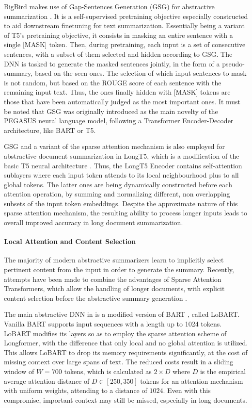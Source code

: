 \documentclass[preprint,review,10pt]{elsarticle}
\begin{document}
	BigBird makes use of Gap-Sentences Generation (GSG) for abstractive summarization \cite{pegasus}. It is a self-supervised pretraining objective especially constructed to aid downstream finetuning for text summarization. Essentially being a variant of T5's pretraining objective, it consists in masking an entire sentence with a single [MASK] token. Then, during pretraining, each input is a set of consecutive sentences, with a subset of them selected and hidden according to GSG. The DNN is tasked to generate the masked sentences jointly, in the form of a pseudo-summary, based on the seen ones. The selection of which input sentences to mask is not random, but based on the ROUGE score of each sentence with the remaining input text. Thus, the ones  finally hidden with [MASK] tokens are those that have been automatically judged as the most important ones. It must be noted that GSG was originally introduced as the main novelty of the PEGASUS neural language model, following a Transformer Encoder-Decoder architecture, like BART or T5.
	
	GSG and a variant of the sparse attention mechanism is also employed for abstractive document summarization in LongT5, which is a modification of the basic T5 neural architecture \cite{Guo22LongT5}. Thus, the LongT5 Encoder contains self-attention sublayers where each input token attends to its local neighbourhood plus to all global tokens. The latter ones are being dynamically constructed before each attention operation, by summing and normalizing different, non overlapping subsets of the input token embeddings. Despite the approximate nature of this sparse attention mechanism, the resulting ability to process longer inputs leads to overall improved accuracy in long document summarization.
	
	\paragraph{Local Attention and Content Selection} The majority of modern abstractive summarizers learn to implicitly select pertinent content from the input in order to generate the summary. Recently, attempts have been made to combine the advantages of Sparse Attention Transformers, which allow the handling of longer documents, with explicit content selection before the abstractive summary generation \cite{gales}.
	
	The main abstractive DNN in \cite{gales} is a modified version of BART \cite{bart}, called LoBART. Vanilla BART supports input sequences with a length up to 1024 tokens. LoBART modifies its layers so as to employ the sparse attention scheme of Longformer, with the difference that only local and no global attention is utilized. This allows LoBART to drop its memory requirements significantly, at the cost of missing context over large spans of text. The reduced costs result in a sliding window of $W=700$ tokens, which is calculated as $2 \times D$ where $D$ is the empirical average attention distance of $D \in [250, 350]$ tokens for an attention mechanism with uniform weights, attending to a distance of $1024$. Even with this compromise, important context may still be missed, especially in long documents.
	
\end{document}

